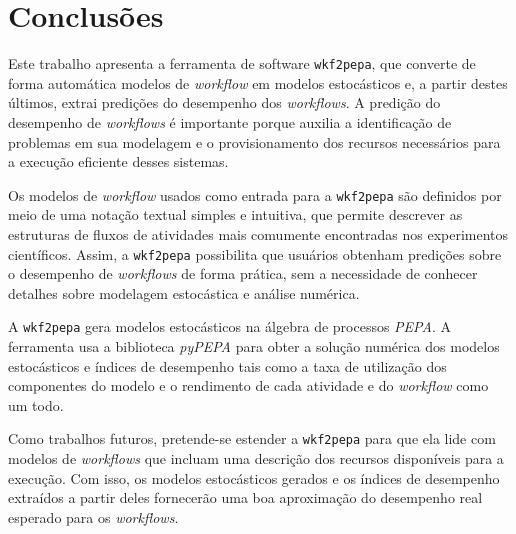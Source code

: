 \documentclass[a4paper,10pt]{article}
\begin{document}
    \newpage
    \section*{Conclusões}

    Este trabalho apresenta a ferramenta de software \texttt{wkf2pepa}, que converte de forma autom\'atica modelos de \emph{workflow} em modelos estocásticos e, a partir destes \'ultimos, extrai predições do desempenho dos \emph{workflows}. A predição do desempenho de \emph{workflows} é importante porque auxilia a identificação de problemas em sua modelagem e o provisionamento dos recursos necessários para a execução eficiente desses sistemas.

    Os modelos de \emph{workflow} usados como entrada para a \texttt{wkf2pepa} são definidos por meio de uma notaç\~ao textual simples e intuitiva, que permite descrever as estruturas de fluxos de atividades mais comumente encontradas nos experimentos cient\'ificos. Assim, a \texttt{wkf2pepa} possibilita que usuários obtenham predições sobre o desempenho de \emph{workflows} de forma prática, sem a necessidade de conhecer detalhes sobre modelagem estocástica e análise numérica.

    A \texttt{wkf2pepa} gera modelos estocásticos na álgebra de processos \emph{PEPA}. A ferramenta usa a biblioteca \emph{pyPEPA} para obter a solução numérica dos modelos estocásticos e índices de desempenho tais como a taxa de utilização dos componentes do modelo e o rendimento de cada atividade e do \emph{workflow} como um todo.

    Como trabalhos futuros, pretende-se estender a \texttt{wkf2pepa} para que ela lide com modelos de \emph{workflows} que incluam uma descrição dos recursos disponíveis para a execução. Com isso, os modelos estocásticos gerados e os índices de desempenho extraídos a partir deles fornecerão uma boa aproximação do desempenho real esperado para os \emph{workflows}.


    
    
\end{document}
